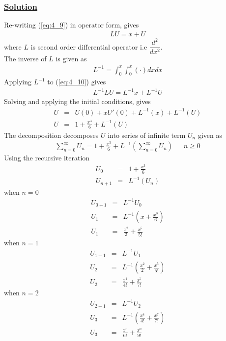 \documentclass[11pt]{report}
\newcommand{\ubt}[1]{\textbf{\underline{#1}}}
\newcommand{\sps}{\\[0.2cm]}
\newcommand{\refn}[1]{(\ref{#1})}
\newcommand{\refx}[1]{\refn{eq:#1}}
\newcommand{\dsp}{\displaystyle}
\newcommand{\sprime}{'}
\newcommand{\solution}{\subsubsection{\ubt{Solution}}}
\begin{document}
	\solution
	Re-writing \refx{4_9} in operator form, gives
	\begin{eqnarray}
		LU = x+U\label{eq:4_10}
	\end{eqnarray}
	where $L$ is second order differential operator i.e $\dsp\dfrac{d^2}{dx^2}$. \\
	The inverse of $L$ is given as
	\begin{eqnarray}
		L^{-1} = \int_0^x\int_0^x(\cdot)dxdx
	\end{eqnarray}
	Applying $L^{-1}$ to \refx{4_10} gives
	\begin{eqnarray}
		L^{-1}LU = L^{-1}x + L^{-1}U
	\end{eqnarray}
	Solving and applying the initial conditions, gives
	\begin{eqnarray}
		U &=&U(0) + xU\sprime(0) + L^{-1}(x) + L^{-1}(U)\sps
		U &=& 1 + \frac{x^3}{6} + L^{-1}(U)\label{eq:4_14}
	\end{eqnarray}
	The decomposition decomposes $U$ into series of infinite term $U_n$ given as
	\begin{eqnarray}
		\sum_{n=0}^{\infty}U_n = 1 + \frac{x^3}{6}+ L^{-1}\left(\sum_{n=0}^\infty U_n\right)~~~~~~~ n \geq 0
	\end{eqnarray}
	Using the recursive iteration
	\begin{eqnarray*}
		U_0 &=& 1 + \frac{x^3}{6}\sps
		U_{n+1} &=& L^{-1}(U_n)
	\end{eqnarray*}
	when $n=0$
	\begin{eqnarray*}
		U_{0+1} & =& L^{-1} U_0\sps
		U_1 &=& L^{-1}\left(x + \frac{x^3}{6}\right)\sps
		U_1 &=& \frac{x^2}{2} + \frac{x^5}{5!}
	\end{eqnarray*}
	when $n=1$
	\begin{eqnarray*}
		U_{1+1} & =& L^{-1}U_1\sps
		U_2 &=& L^{-1}\left(\frac{x^2}{2}+\frac{x^5}{5!}\right)\sps
		U_2 &=& \frac{x^4}{4!} + \frac{x^7}{7!}
	\end{eqnarray*}
	when $n=2$
	\begin{eqnarray*}
		U_{2+1} &=& L^{-1}U_2\sps
		U_3 &=& L^{-1}\left(\frac{x^4}{4!}+ \frac{x^7}{7!}\right)\sps
		U_3 &=& \frac{x^6}{6!} + \frac{x^9}{9!}
	\end{eqnarray*}














	
\end{document}

